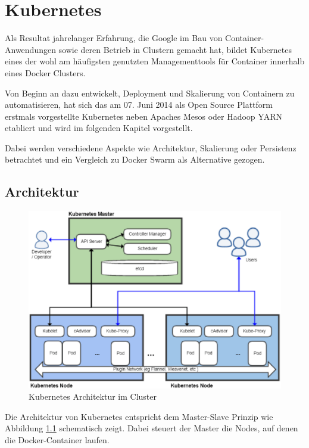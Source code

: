 \chapter{Kubernetes}
\label{c:kubernetes}

Als Resultat jahrelanger Erfahrung, die Google im Bau von Container-Anwendungen sowie deren Betrieb in Clustern gemacht hat, bildet Kubernetes eines der wohl am häufigsten genutzten Managementtools für Container innerhalb eines Docker Clusters.

Von Beginn an dazu entwickelt, Deployment und Skalierung von Containern zu automatisieren, hat sich das am 07. Juni 2014 als Open Source Plattform erstmals vorgestellte Kubernetes neben Apaches Mesos oder Hadoop YARN etabliert und wird im folgenden Kapitel vorgestellt.

Dabei werden verschiedene Aspekte wie Architektur, Skalierung oder Persistenz betrachtet und ein Vergleich zu Docker Swarm als Alternative gezogen.


\section{Architektur}
\begin{figure}
	\centering
	\includegraphics[width=0.9\linewidth]{figures/kubernetes-architecture}
	\caption[Kubernetes Cluster Architektur]{Kubernetes Architektur im Cluster}
	\label{fig:kubernetes-architecture}
	\tiny{}
\end{figure}
Die Architektur von Kubernetes entspricht dem Master-Slave Prinzip wie Abbildung \ref{fig:kubernetes-architecture} schematisch zeigt.
Dabei steuert der Master die Nodes, auf denen die Docker-Container laufen.

